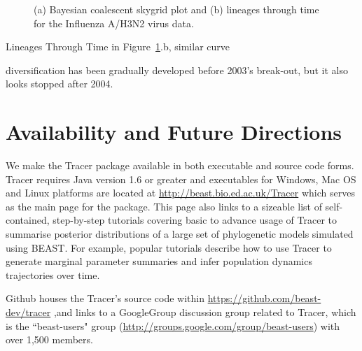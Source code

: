 \documentclass{bioinfo}
\begin{document}
\begin{figure}[ht]
\caption{(a) Bayesian coalescent skygrid plot and (b) lineages through time for the Influenza A/H3N2 virus data.}
\label{fig:flu}
\end{figure}

Lineages Through Time in Figure~\ref{fig:flu}.b, similar curve 

diversification has been gradually developed before 2003's break-out, but it also looks stopped after 2004.



\section*{Availability and Future Directions}

We make the Tracer package available in both executable and source code forms.  Tracer requires Java version 1.6 or greater and executables for Windows, Mac OS and Linux platforms are located at \url{http://beast.bio.ed.ac.uk/Tracer} %
which serves as the main page for the package. This page also links to a sizeable list of self-contained, step-by-step tutorials covering basic to advance usage of Tracer to summarise posterior distributions of a large set of phylogenetic models simulated using BEAST.  For example, popular tutorials describe how to use Tracer to generate marginal parameter summaries and infer population dynamics trajectories over time.

Github houses the Tracer's source code within \url{https://github.com/beast-dev/tracer} ,and links to a GoogleGroup discussion group related to Tracer,  
which is the ``beast-users" group (\url{http://groups.google.com/group/beast-users}) with over 1,500 members. 
\end{document}
